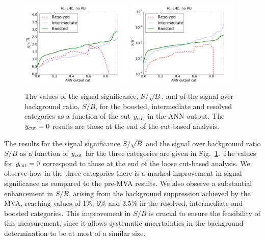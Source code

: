 \begin{figure}[t]
\begin{center}
\includegraphics[width=0.48\textwidth]{plots/ssb_noPU.pdf}
\includegraphics[width=0.48\textwidth]{plots/sb_noPU.pdf}
\caption{\small
  The values of the signal significance, $S/\sqrt{B}$, and of the
  signal over background ratio, $S/B$, for the boosted, intermediate
  and resolved categories as a function of the cut
  $y_{\rm cut}$ in the ANN output.
  The $y_{\rm cut}=0$
  results are those at the end of the cut-based
  analysis.
}
\label{fig:sb_mva}
\end{center}
\end{figure}

The results for the signal significance $S/\sqrt{B}$ and
the signal over background ratio
$S/B$ as a function of $y_{\rm cut}$
for the three categories are given in 
Fig.~\ref{fig:sb_mva}.
%
The values 
for $y_{\rm cut}=0$ correspond to those at
the end of the loose cut-based analysis.
%
We observe how in the three
 categories there is a marked  improvement in signal
significance as compared to the pre-MVA results.
%
We also observe a substantial enhancement in $S/B$, arising
from the background suppression achieved by the MVA, reaching
values of 1\%, 6\% and 3.5\% in the resolved,
intermediate and boosted categories.
%
This improvement in $S/B$ is crucial to ensure the feasibility
of this measurement, since it allows systematic
uncertainties in the background determination to
be at most of a similar size.

